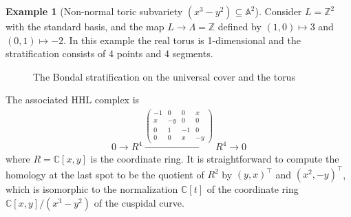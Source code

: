 \documentclass[11pt,reqno]{amsart}
\def\C {{\mathbb C}}
\def\Z {{\mathbb Z}}
\theoremstyle{definition}
\newtheorem{example}[theorem]{Example}
\numberwithin{equation}{section}
\begin{document}
\begin{example}[Non-normal toric subvariety $(x^3-y^2)\subseteq \mathbb{A}^2$]

    Consider $L = \Z^2$ with the standard basis, and the map $L\rightarrow\Lambda = \Z$ defined by $(1,0)\mapsto 3$ and $(0,1)\mapsto -2$. In this example the real torus is 1-dimensional and the stratification consists of 4 points and 4 segments.
    \begin{figure}[H]
        \centering
    \hspace{1.5cm}
    \caption{The Bondal stratification on the universal cover and the torus}
    \end{figure}
    The associated HHL complex is 
    \begin{align*}
        0\rightarrow 
        R^4\xrightarrow{\begin{pmatrix} -1 & 0 & 0 & x \\ x & -y & 0 & 0 \\ 0 & 1 & -1 & 0 \\ 0 & 0 & x & -y \end{pmatrix}} R^4 \rightarrow 0 
    \end{align*}
    where $R=\C[x,y]$ is the coordinate ring. It is straightforward to compute the homology at the last spot to be the quotient of $R^2$ by $(y,x)^{\top}$ and $(x^2,-y)^{\top}$, which is isomorphic to the normalization $\C[t]$ of the coordinate ring $\C[x,y]/(x^3-y^2)$ of the cuspidal curve.
\end{example}
\end{document}
